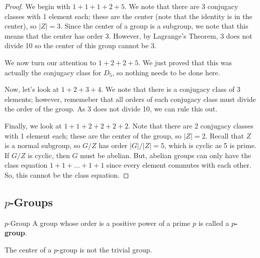 \documentclass[letterpaper]{article}
\begin{document}
\begin{mdframed}
    \begin{proof}
        We begin with $1 + 1 + 1 + 2 + 5$. We note that there are 3 conjugacy classes with 1 element each; these are the center (note that the identity is in the center), so $|Z| = 3$. Since the center of a group is a subgroup, we note that this means that the center has order 3. However, by Lagrange's Theorem, 3 does not divide 10 so the center of this group cannot be 3. 

        \bigskip

        We now turn our attention to $1 + 2 + 2 + 5$. We just proved that this was actually the conjugacy class for $D_5$, so nothing needs to be done here. 

        \bigskip

        Now, let's look at $1 + 2 + 3 + 4$. We note that there is a conjugacy class of 3 elements; however, rememeber that all orders of each conjugacy class must divide the order of the group. As 3 does not divide 10, we can rule this out. 

        \bigskip

        Finally, we look at $1 + 1 + 2 + 2 + 2 + 2$. Note that there are 2 conjugacy classes with 1 element each; these are the center of the group, so $|Z| = 2$. Recall that $Z$ is a normal subgroup, so $G / Z$ has order $|G| / |Z| = 5$, which is cyclic as 5 is prime. If $G/Z$ is cyclic, then $G$ must be abelian. But, abelian groups can only have the class equation $1 + 1 + \dots + 1 + 1$ since every element commutes with each other. So, this cannot be the class equation. 
    \end{proof}
\end{mdframed}

\subsection{\texorpdfstring{$p$}{p}-Groups}
\begin{definition}{$p$-Group}{}
    A group whose order is a positive power of a prime $p$ is called a \textbf{$p$-group}.
\end{definition} 

\begin{mdframed}
    \begin{proposition}
        The center of a $p$-group is not the trivial group. 
    \end{proposition}
\end{mdframed}
\end{document}
